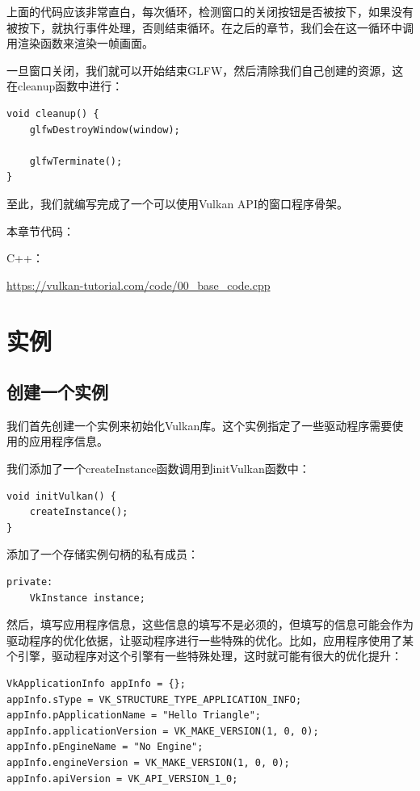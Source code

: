 \documentclass{ctexart}
\begin{document}
上面的代码应该非常直白，每次循环，检测窗口的关闭按钮是否被按下，如果没有被按下，就执行事件处理，否则结束循环。在之后的章节，我们会在这一循环中调用渲染函数来渲染一帧画面。

一旦窗口关闭，我们就可以开始结束GLFW，然后清除我们自己创建的资源，这在cleanup函数中进行：

\begin{lstlisting}[language={[ANSI]C}]
void cleanup() {
	glfwDestroyWindow(window);

	glfwTerminate();
}
\end{lstlisting}

至此，我们就编写完成了一个可以使用Vulkan API的窗口程序骨架。

本章节代码：

C++：

\url{https://vulkan-tutorial.com/code/00_base_code.cpp}

\newpage
\section{实例}

\subsection{创建一个实例}

我们首先创建一个实例来初始化Vulkan库。这个实例指定了一些驱动程序需要使用的应用程序信息。

我们添加了一个createInstance函数调用到initVulkan函数中：

\begin{lstlisting}[language={[ANSI]C}]
void initVulkan() {
	createInstance();
}
\end{lstlisting}

添加了一个存储实例句柄的私有成员：

\begin{lstlisting}[language={[ANSI]C}]
private:
	VkInstance instance;
\end{lstlisting}

然后，填写应用程序信息，这些信息的填写不是必须的，但填写的信息可能会作为驱动程序的优化依据，让驱动程序进行一些特殊的优化。比如，应用程序使用了某个引擎，驱动程序对这个引擎有一些特殊处理，这时就可能有很大的优化提升：

\begin{lstlisting}[language={[ANSI]C}]
VkApplicationInfo appInfo = {};
appInfo.sType = VK_STRUCTURE_TYPE_APPLICATION_INFO;
appInfo.pApplicationName = "Hello Triangle";
appInfo.applicationVersion = VK_MAKE_VERSION(1, 0, 0);
appInfo.pEngineName = "No Engine";
appInfo.engineVersion = VK_MAKE_VERSION(1, 0, 0);
appInfo.apiVersion = VK_API_VERSION_1_0;
\end{lstlisting}
\end{document}
